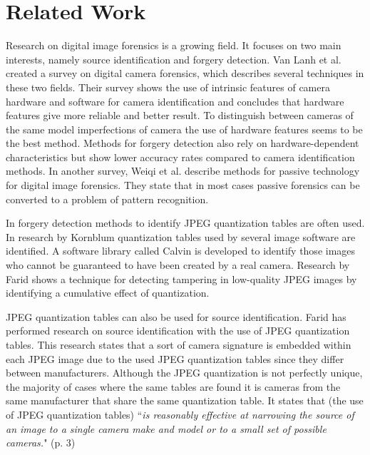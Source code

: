 
\chapter{Related Work} %

\label{ch:literature} %



Research on digital image forensics is a growing field. It focuses on two main interests, namely source identification and forgery detection. Van Lanh et al. \cite{van2007survey} created a survey on digital camera forensics, which describes several techniques in these two fields. Their survey shows the use of intrinsic features of camera hardware and software for camera identification and concludes that hardware features give more reliable and better result. To distinguish between cameras of the same model imperfections of camera the use of hardware features seems to be the best method. Methods for forgery detection also rely on hardware-dependent characteristics but show lower accuracy rates compared to camera identification methods. In another survey, Weiqi et al. \cite{luo2007survey} describe methods for passive technology for digital image forensics. They state that in most cases passive forensics can be converted to a problem of pattern recognition.

In forgery detection methods to identify JPEG quantization tables are often used. In research by Kornblum\cite{kornblum2008using} quantization tables used by several image software are identified. A software library called Calvin is developed to identify those images who cannot
be guaranteed to have been created by a real camera. Research by Farid\cite{4773149} shows a technique for detecting tampering in low-quality JPEG images by identifying a cumulative effect of quantization.

JPEG quantization tables can also be used for source identification. Farid has performed research\cite{farid1}\cite{farid2008digital} on source identification with the use of JPEG quantization tables. This research states that a sort of camera signature is embedded within each JPEG image due to the used JPEG quantization tables since they differ between manufacturers. Although the JPEG quantization is not perfectly unique, the majority of cases where the same tables are found it is cameras from the same manufacturer that share the same quantization table. It states that (the use of JPEG quantization tables) ``\textit{is reasonably effective at narrowing the source of an image to a single camera make and model or to a small set of possible cameras.}" (p. 3)

